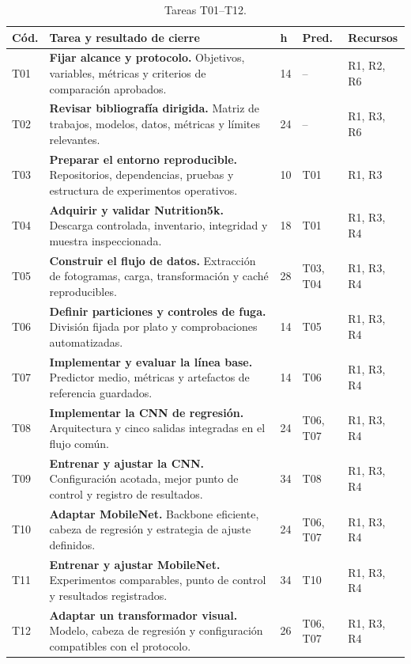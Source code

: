 \documentclass[10pt,a4paper]{article}
\newcommand{\task}[1]{\textbf{#1}}
\begin{document}
\begin{table}[h]
\centering
\caption{Tareas T01--T12.}
\scriptsize
\begin{tabularx}{\textwidth}{C{0.9cm}Y C{0.65cm} L{1.5cm} L{1.9cm}}
\toprule
\textbf{Cód.} & \textbf{Tarea y resultado de cierre} & \textbf{h} & \textbf{Pred.} & \textbf{Recursos} \\
\midrule
T01 & \task{Fijar alcance y protocolo.} Objetivos, variables, métricas y criterios de comparación aprobados. & 14 & -- & R1, R2, R6 \\
T02 & \task{Revisar bibliografía dirigida.} Matriz de trabajos, modelos, datos, métricas y límites relevantes. & 24 & -- & R1, R3, R6 \\
T03 & \task{Preparar el entorno reproducible.} Repositorios, dependencias, pruebas y estructura de experimentos operativos. & 10 & T01 & R1, R3 \\
T04 & \task{Adquirir y validar Nutrition5k.} Descarga controlada, inventario, integridad y muestra inspeccionada. & 18 & T01 & R1, R3, R4 \\
T05 & \task{Construir el flujo de datos.} Extracción de fotogramas, carga, transformación y caché reproducibles. & 28 & T03, T04 & R1, R3, R4 \\
T06 & \task{Definir particiones y controles de fuga.} División fijada por plato y comprobaciones automatizadas. & 14 & T05 & R1, R3, R4 \\
T07 & \task{Implementar y evaluar la línea base.} Predictor medio, métricas y artefactos de referencia guardados. & 14 & T06 & R1, R3, R4 \\
T08 & \task{Implementar la CNN de regresión.} Arquitectura y cinco salidas integradas en el flujo común. & 24 & T06, T07 & R1, R3, R4 \\
T09 & \task{Entrenar y ajustar la CNN.} Configuración acotada, mejor punto de control y registro de resultados. & 34 & T08 & R1, R3, R4 \\
T10 & \task{Adaptar MobileNet.} Backbone eficiente, cabeza de regresión y estrategia de ajuste definidos. & 24 & T06, T07 & R1, R3, R4 \\
T11 & \task{Entrenar y ajustar MobileNet.} Experimentos comparables, punto de control y resultados registrados. & 34 & T10 & R1, R3, R4 \\
T12 & \task{Adaptar un transformador visual.} Modelo, cabeza de regresión y configuración compatibles con el protocolo. & 26 & T06, T07 & R1, R3, R4 \\
\bottomrule
\end{tabularx}
\end{table}
\end{document}
